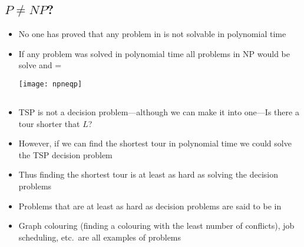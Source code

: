 \begin{slide}
\section[-2]{$P\neq NP$?}

\begin{PauseHighLight}
  \begin{itemize}
  \item No one has proved that any problem in  is not solvable in
    polynomial time\pause
  \item If any  problem was solved in
    polynomial time all problems in NP would be solve and
    =
    \begin{center}
      \texttt{[image: npneqp]}\pause
    \end{center}
  \end{itemize}
\end{PauseHighLight}

\end{slide}



\begin{slide}
\section[-1]{}

\begin{PauseHighLight}
  \begin{itemize}
  \item TSP is not a decision problem---although we can make it into
    one---Is there a tour shorter that $L$?\pause
  \item However, if we can find the shortest tour in polynomial time we
    could solve the TSP decision problem\pause
  \item Thus finding the shortest tour is at least as hard as solving the
    decision problems\pause
  \item Problems that are at least as hard as  decision
    problems are said to be in \emph{}\pause
  \item Graph colouring (finding a colouring with the least number of
    conflicts), job scheduling, etc.\ are all examples of 
    problems\pause
  \end{itemize}
\end{PauseHighLight}

\end{slide}

